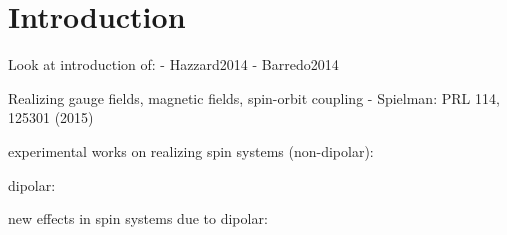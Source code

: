 \chapter*{Introduction}

Look at introduction of:
- Hazzard2014
- Barredo2014

Realizing gauge fields, magnetic fields, spin-orbit coupling
- Spielman: PRL 114, 125301 (2015)


experimental works on realizing spin systems (non-dipolar):~\cite{Fukuhara2013,Simon2011}

dipolar:~\cite{DePaz2013}

new effects in spin systems due to dipolar:~\cite{Avellino2006,Hauke2010,Peter2012b,Hazzard2014}
